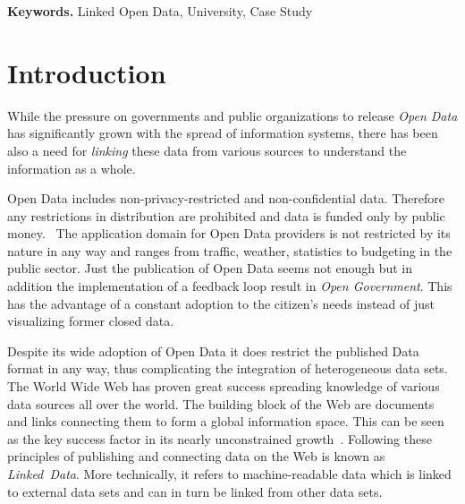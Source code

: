 \documentclass{article}
\begin{document}
\smallskip
\noindent \textbf{Keywords.} Linked Open Data, University, Case Study

\newpage


\tableofcontents

\newpage



\section{Introduction}
\label{introduction}
While the pressure on governments and public organizations to release \textit{Open Data} has significantly grown with the spread of information systems, there has been also a need for \textit{linking} these data from various sources to understand the information as a whole.

Open Data includes non-privacy-restricted and non-confidential data. Therefore any restrictions in distribution are prohibited and data is funded only by public money.~\cite{janssen_benefits_2012} The application domain for Open Data providers is not restricted by its nature in any way and ranges from traffic, weather, statistics to budgeting in the public sector. Just the publication of Open Data seems not enough but in addition the implementation of a feedback loop result in \textit{Open Government}. This has the advantage of a constant adoption to the citizen's needs instead of just visualizing former closed data. 

Despite its wide adoption of Open Data it does restrict the published Data format in any way, thus complicating the integration of heterogeneous data sets. The World Wide Web has proven great success spreading knowledge of various data sources all over the world. The building block of the Web are documents and links connecting them to form a global information space. This can be seen as the key success factor in its nearly unconstrained growth~\cite{jacobs_architecture_2004}. 
Following these principles of publishing and connecting data on the Web is known as \textit{Linked~Data}. More technically, it refers to machine-readable data which is linked to external data sets and can in turn be linked from other data sets. 
\end{document}
